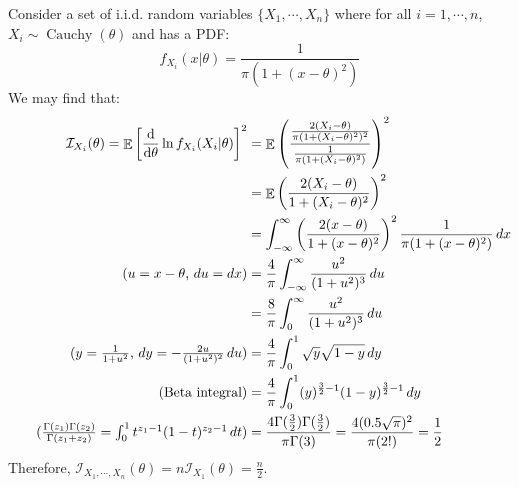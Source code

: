 \documentclass{huhtakm-template-book-v2}
\DeclareMathOperator{\E}{\mathbb{E}}
\DeclareMathOperator{\Cauchy}{Cauchy}
\begin{document}
\begin{eg}
	Consider a set of i.i.d. random variables $\{X_{1},\cdots,X_{n}\}$ where for all $i=1,\cdots,n$, $X_{i}\sim\Cauchy(\theta)$ and has a PDF:
	\begin{equation*}
		f_{X_{i}}(x|\theta)=\frac{1}{\pi(1+(x-\theta)^{2})}
	\end{equation*}
	We may find that:
	\begin{align*}
		\mathcal{I}_{X_{i}}(\theta)=\E\left[\odv*{}{\theta}\ln{f_{X_{i}}(X_{i}|\theta)}\right]^{2}&=\E\left(\frac{\frac{2(X_{i}-\theta)}{\pi(1+(X_{i}-\theta)^{2})^{2}}}{\frac{1}{\pi(1+(X_{i}-\theta)^{2})}}\right)^{2}\\
		&=\E\left(\frac{2(X_{i}-\theta)}{1+(X_{i}-\theta)^{2}}\right)^{2}\\
		&=\intinfty\left(\frac{2(x-\theta)}{1+(x-\theta)^{2}}\right)^{2}\frac{1}{\pi(1+(x-\theta)^{2})}\,dx\\
		\tag{$u=x-\theta$, $du=dx$}
		&=\frac{4}{\pi}\intinfty\frac{u^{2}}{(1+u^{2})^{3}}\,du\\
		&=\frac{8}{\pi}\int_{0}^{\infty}\frac{u^{2}}{(1+u^{2})^{3}}\,du\\
		\tag{$y=\frac{1}{1+u^{2}}$, $dy=-\frac{2u}{(1+u^{2})^{2}}\,du$}
		&=\frac{4}{\pi}\int_{0}^{1}\sqrt{y}\sqrt{1-y}\,dy\\
		\tag{Beta integral}
		&=\frac{4}{\pi}\int_{0}^{1}(y)^{\frac{3}{2}-1}(1-y)^{\frac{3}{2}-1}\,dy\\
		\tag{$\frac{\Gamma(z_{1})\Gamma(z_{2})}{\Gamma(z_{1}+z_{2})}=\int_{0}^{1}t^{z_{1}-1}(1-t)^{z_{2}-1}\,dt$}
		&=\frac{4\Gamma(\frac{3}{2})\Gamma(\frac{3}{2})}{\pi\Gamma(3)}=\frac{4(0.5\sqrt{\pi})^{2}}{\pi(2!)}=\frac{1}{2}
	\end{align*}
	Therefore, $\mathcal{I}_{X_{1},\cdots,X_{n}}(\theta)=n\mathcal{I}_{X_{1}}(\theta)=\frac{n}{2}$.
\end{eg}
\end{document}
